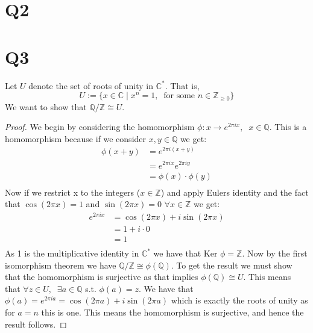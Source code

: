 \documentclass{article}
\begin{document}
\section*{Q2}

\section*{Q3}
Let $U$ denote the set of roots of unity in $\mathbb{C}^*$. That is,
$$U:=\{x\in\mathbb{C}\;|\;x^n=1,\;\;\text{for some }n\in\mathbb{Z}_{\geq0}\}$$
We want to show that $\mathbb{Q}/\mathbb{Z}\cong U$.
\begin{proof}
We begin by considering the homomorphism $\phi:x\rightarrow e^{2\pi ix}, \;\;x\in\mathbb{Q}$. This is a homomorphism because if we consider $x,y\in\mathbb{Q}$ we get:
\begin{align*}
\phi(x+y)&=e^{2\pi i(x+y)}\\
&=e^{2\pi ix}e^{2\pi iy}\\
&=\phi(x)\cdot\phi(y)\\
\end{align*}
Now if we restrict x to the integers ($x\in\mathbb{Z}$) and apply Eulers identity and the fact that $\cos(2\pi x)=1$ and $\sin(2\pi x)=0$ $\forall x\in\mathbb{Z}$ we get:
\begin{align*}
e^{2\pi ix}&=\cos(2\pi x)+i\sin(2\pi x)\\
&=1+i\cdot0\\
&=1\\
\end{align*}
As 1 is the multiplicative identity in $\mathbb{C}^*$ we have that $\text{Ker }\phi=\mathbb{Z}$. Now by the first isomorphism theorem we have $\mathbb{Q}/\mathbb{Z}\cong \phi(\mathbb{Q})$. To get the result we must show that the homomorphism is surjective as that implies $\phi(\mathbb{Q})\cong U$. This means that $\forall z\in U,\;\;\exists a\in\mathbb{Q}$ s.t. $\phi\left(a\right)=z$. We have that $\phi(a)=e^{2\pi i a}=\cos(2\pi a)+i\sin(2\pi a)$ which is exactly the roots of unity as for $a=n$ this is one. This means the homomorphism is surjective, and hence the result follows.
\end{proof}
\end{document}
